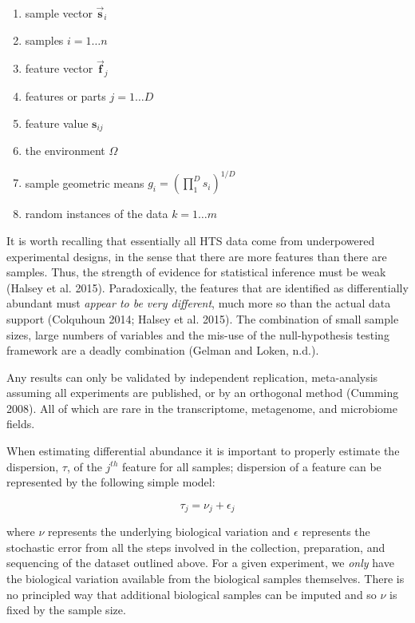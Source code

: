 \documentclass[onecolumn]{article}
\providecommand{\tightlist}{%
  \setlength{\itemsep}{0pt}\setlength{\parskip}{0pt}}
\newcommand{\vect}[1]{\vec{\textbf{#1}}}
\begin{document}
\begin{enumerate}
\def\labelenumi{\arabic{enumi}.}
\tightlist
\item
  sample vector \(\vect{s}_i\)
\item
  samples \(i=1 \ldots n\)
\item
  feature vector \(\vect{f}_j\)
\item
  features or parts \(j=1 \ldots D\)
\item
  feature value \(\textbf{s}_{ij}\)
\item
  the environment \(\Omega\)
\item
  sample geometric means \(g_i= ( \prod_{1}^{D} s_i )^{1/D}\)
\item
  random instances of the data \(k=1 \ldots m\)
\end{enumerate}

It is worth recalling that essentially all HTS data come from underpowered experimental designs, in the sense that there are more features than there are samples. Thus, the strength of evidence for statistical inference must be weak (Halsey et al. 2015). Paradoxically, the features that are identified as differentially abundant must \emph{appear to be very different}, much more so than the actual data support (Colquhoun 2014; Halsey et al. 2015). The combination of small sample sizes, large numbers of variables and the mis-use of the null-hypothesis testing framework are a deadly combination (Gelman and Loken, n.d.).

Any results can only be validated by independent replication, meta-analysis assuming all experiments are published, or by an orthogonal method (Cumming 2008). All of which are rare in the transcriptome, metagenome, and microbiome fields.

When estimating differential abundance it is important to properly estimate the dispersion, \(\tau\), of the \(j^{th}\) feature for all samples; dispersion of a feature can be represented by the following simple model:

\begin{equation}
    \tau_{j} = \nu_j + \epsilon_j
\label{eq:dispersion}
\end{equation}

where \(\nu\) represents the underlying biological variation and \(\epsilon\) represents the stochastic error from all the steps involved in the collection, preparation, and sequencing of the dataset outlined above. For a given experiment, we \emph{only} have the biological variation available from the biological samples themselves. There is no principled way that additional biological samples can be imputed and so \(\nu\) is fixed by the sample size.
\end{document}
